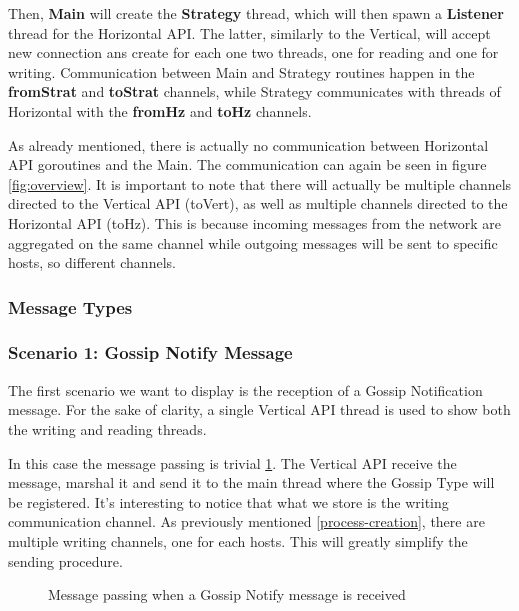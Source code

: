 \documentclass[a4paper,english,10pt,NET]{tumarticle}
\begin{document}
Then, \textbf{Main} will create the \textbf{Strategy} thread, which will then spawn a \textbf{Listener} thread for the {Horizontal API}. The latter, similarly to the Vertical, will accept new connection ans create for each one two threads, one for reading and one for writing. Communication between Main and Strategy routines happen in the \textbf{fromStrat} and \textbf{toStrat} channels, while Strategy communicates with threads of Horizontal with the \textbf{fromHz} and \textbf{toHz} channels.

As already mentioned, there is actually no communication between Horizontal API goroutines and the Main. The communication can again be seen in figure \ref{fig:overview}. It is important to note that there will actually be multiple channels directed to the Vertical API (toVert), as well as multiple channels directed to the Horizontal API (toHz). This is because incoming messages from the network are aggregated on the same channel while outgoing messages will be sent to specific hosts, so different channels.

\subsubsection{Message Types}


\subsubsection{Scenario 1: Gossip Notify Message}

The first scenario we want to display is the reception of a Gossip Notification message. For the sake of clarity, a single Vertical API thread is used to show both the writing and reading threads.

In this case the message passing is trivial \ref{fig:msg-notify}. The Vertical API receive the message, marshal it and send it to the main thread where the Gossip Type will be registered. It's interesting to notice that what we store is the writing communication channel. As previously mentioned \ref{process-creation}, there are multiple writing channels, one for each hosts. This will greatly simplify the sending procedure.

\begin{figure}
	\centering
	
	\caption{Message passing when a Gossip Notify message is received}
	\label{fig:msg-notify}
\end{figure}
\end{document}
